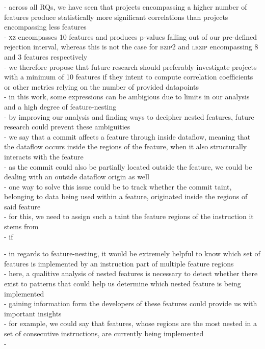 - across all RQs, we have seen that projects encompassing a higher number of features produce statistically more significant correlations than projects encompassing less features \\
- \textsc{xz} encompasses 10 features and produces p-values falling out of our pre-defined rejection interval, whereas this is not the case for \textsc{bzip2} and \textsc{lrzip} encompassing 8 and 3 features respectively \\
- we therefore propose that future research should preferably investigate projects with a minimum of 10 features if they intent to compute correlation coefficients or other metrics relying on the number of provided datapoints \\










\iffalse 
- in this work, some expressions can be ambigious due to limits in our analysis and a high degree of feature-nesting \\
- by improving our analysis and finding ways to decipher nested features, future research could prevent these ambiguities \\
- we say that a commit affects a feature through inside dataflow, meaning that the dataflow occurs inside the regions of the feature, when it also structurally interacts with the feature \\
- as the commit could also be partially located outside the feature, we could be dealing with an outside dataflow origin as well \\
- one way to solve this issue could be to track whether the commit taint, belonging to data being used within a feature, originated inside the regions of said feature \\
- for this, we need to assign such a taint the feature regions of the instruction it stems from \\
- if 

- in regards to feature-nesting, it would be extremely helpful to know which set of features is implemented by an instruction part of multiple feature regions \\
- here, a qualitive analysis of nested features is necessary to detect whether there exist to patterns that could help us determine which nested feature is being implemented \\
- gaining information form the developers of these features could provide us with important insights \\
- for example, we could say that features, whose regions are the most nested in a set of consecutive instructions, are currently being implemented \\
-

